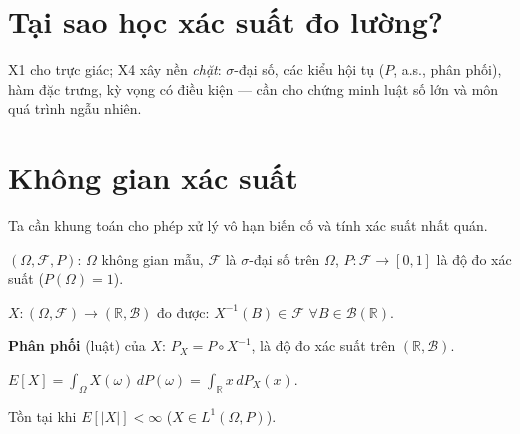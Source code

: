 \documentclass[12pt,a4paper]{article}
\begin{document}

\newpage
\tableofcontents
\newpage



\section{Tại sao học xác suất đo lường?}

\begin{dongco}[title={Động cơ --- Tại sao học xác suất đo lường?}]
X1 cho trực giác; X4 xây nền \emph{chặt}: $\sigma$-đại số, các kiểu hội tụ ($P$, a.s., phân phối), hàm đặc trưng, kỳ vọng có điều kiện --- cần cho chứng minh luật số lớn và môn quá trình ngẫu nhiên.
\end{dongco}

\newpage

\section{Không gian xác suất}

\begin{dongco}[title={Động cơ --- Không gian xác suất}]
Ta cần khung toán cho phép xử lý vô hạn biến cố và tính xác suất nhất quán.
\end{dongco}

\begin{dinhnghia}
  $(\Omega, \mathcal{F}, P)$: $\Omega$ không gian mẫu, $\mathcal{F}$ là $\sigma$-đại số trên $\Omega$, $P: \mathcal{F} \to [0, 1]$ là độ đo xác suất ($P(\Omega) = 1$).
\end{dinhnghia}

\begin{dinhnghia}[title={Biến ngẫu nhiên (đo được)}]
  $X: (\Omega, \mathcal{F}) \to (\mathbb{R}, \mathcal{B})$ đo được: $X^{-1}(B) \in \mathcal{F}$ $\forall B \in \mathcal{B}(\mathbb{R})$.

  \textbf{Phân phối} (luật) của $X$: $P_X = P \circ X^{-1}$, là độ đo xác suất trên $(\mathbb{R}, \mathcal{B})$.
\end{dinhnghia}

\begin{dinhnghia}[title={Tích phân Lebesgue là kỳ vọng}]
  $E[X] = \displaystyle\int_\Omega X(\omega)\,dP(\omega) = \int_{\mathbb{R}} x\,dP_X(x)$.

  Tồn tại khi $E[|X|] < \infty$ ($X \in L^1(\Omega, P)$).
\end{dinhnghia}

\end{document}
